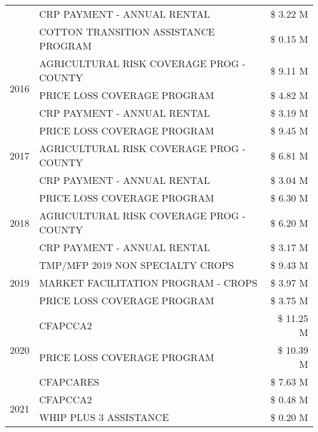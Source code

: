 \begin{tabular}{llr}
 & CRP PAYMENT - ANNUAL RENTAL & \$ 3.22 M \\
 & COTTON TRANSITION ASSISTANCE PROGRAM & \$ 0.15 M \\
\cline{1-3}
\multirow[t]{3}{*}{2016} & AGRICULTURAL RISK COVERAGE PROG - COUNTY & \$ 9.11 M \\
 & PRICE LOSS COVERAGE PROGRAM & \$ 4.82 M \\
 & CRP PAYMENT - ANNUAL RENTAL & \$ 3.19 M \\
\cline{1-3}
\multirow[t]{3}{*}{2017} & PRICE LOSS COVERAGE PROGRAM & \$ 9.45 M \\
 & AGRICULTURAL RISK COVERAGE PROG - COUNTY & \$ 6.81 M \\
 & CRP PAYMENT - ANNUAL RENTAL & \$ 3.04 M \\
\cline{1-3}
\multirow[t]{3}{*}{2018} & PRICE LOSS COVERAGE PROGRAM & \$ 6.30 M \\
 & AGRICULTURAL RISK COVERAGE PROG - COUNTY & \$ 6.20 M \\
 & CRP PAYMENT - ANNUAL RENTAL & \$ 3.17 M \\
\cline{1-3}
\multirow[t]{3}{*}{2019} & TMP/MFP 2019 NON SPECIALTY CROPS & \$ 9.43 M \\
 & MARKET FACILITATION PROGRAM - CROPS & \$ 3.97 M \\
 & PRICE LOSS COVERAGE PROGRAM & \$ 3.75 M \\
\cline{1-3}
\multirow[t]{3}{*}{2020} & CFAPCCA2 & \$ 11.25 M \\
 & PRICE LOSS COVERAGE PROGRAM & \$ 10.39 M \\
 & CFAPCARES & \$ 7.63 M \\
\cline{1-3}
\multirow[t]{2}{*}{2021} & CFAPCCA2 & \$ 0.48 M \\
 & WHIP PLUS 3 ASSISTANCE & \$ 0.20 M \\
\cline{1-3}
\bottomrule
\end{tabular}
